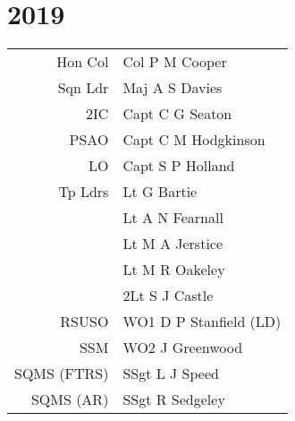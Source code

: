 \chapter*{2019}

\vspace*{10mm}

\begin{center}
  \small
  \begin{tabular}{rl}
    Hon Col & Col P M Cooper \\
    Sqn Ldr & Maj A S Davies \\
    2IC & Capt C G Seaton \\
    PSAO & Capt C M Hodgkinson \\
    LO & Capt S P Holland \\
    Tp Ldrs & Lt G Bartie \\
     & Lt A N Fearnall \\
     & Lt M A Jerstice \\
     & Lt M R Oakeley \\
     & 2Lt S J Castle \\
    RSUSO & WO1 D P Stanfield (LD) \\
    SSM & WO2 J Greenwood \\
    SQMS (FTRS) & SSgt L J Speed \\
    SQMS (AR) & SSgt R Sedgeley \\
  \end{tabular}
\end{center}

\vspace*{5mm}

